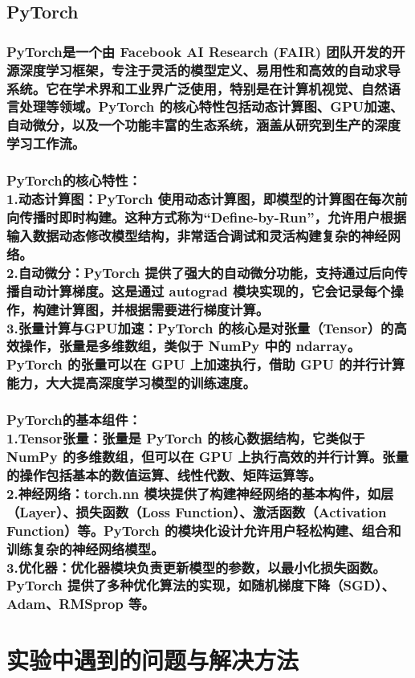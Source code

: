 \documentclass[UTF8,a4paper]{ctexart}
\begin{document}
\begin{sloppypar}
	\bigskip
	\bigskip
	\bigskip
	\bigskip
	
	\subsection{PyTorch}
	\subsubsection{PyTorch是一个由 Facebook AI Research (FAIR) 团队开发的开源深度学习框架，专注于灵活的模型定义、易用性和高效的自动求导系统。它在学术界和工业界广泛使用，特别是在计算机视觉、自然语言处理等领域。PyTorch 的核心特性包括动态计算图、GPU加速、自动微分，以及一个功能丰富的生态系统，涵盖从研究到生产的深度学习工作流。}
	\subsubsection{PyTorch的核心特性：\\1.动态计算图：PyTorch 使用动态计算图，即模型的计算图在每次前向传播时即时构建。这种方式称为“Define-by-Run”，允许用户根据输入数据动态修改模型结构，非常适合调试和灵活构建复杂的神经网络。\\2.自动微分：PyTorch 提供了强大的自动微分功能，支持通过后向传播自动计算梯度。这是通过 autograd 模块实现的，它会记录每个操作，构建计算图，并根据需要进行梯度计算。\\3.张量计算与GPU加速：PyTorch 的核心是对张量（Tensor）的高效操作，张量是多维数组，类似于 NumPy 中的 ndarray。PyTorch 的张量可以在 GPU 上加速执行，借助 GPU 的并行计算能力，大大提高深度学习模型的训练速度。}
	\subsubsection{PyTorch的基本组件：\\1.Tensor张量：张量是 PyTorch 的核心数据结构，它类似于 NumPy 的多维数组，但可以在 GPU 上执行高效的并行计算。张量的操作包括基本的数值运算、线性代数、矩阵运算等。\\2.神经网络：torch.nn 模块提供了构建神经网络的基本构件，如层（Layer）、损失函数（Loss Function）、激活函数（Activation Function）等。PyTorch 的模块化设计允许用户轻松构建、组合和训练复杂的神经网络模型。\\3.优化器：优化器模块负责更新模型的参数，以最小化损失函数。PyTorch 提供了多种优化算法的实现，如随机梯度下降（SGD）、Adam、RMSprop 等。}
	
	\graphicspath{{picture/}}

	\newpage
	
	\section{实验中遇到的问题与解决方法}

\end{sloppypar}
\end{document}
